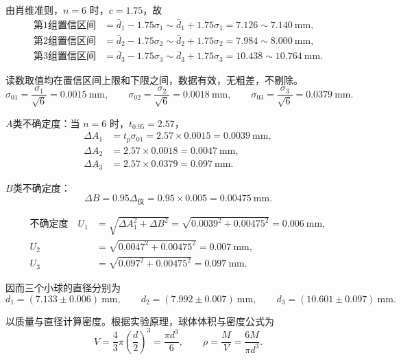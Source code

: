 \documentclass[12pt,a4paper,fontset=windows]{ctexart}
\begin{document}
由肖维准则，$n=6$ 时，$c=1.75$，故
\begin{align*}
    \text{第1组置信区间}&=\bar d_1-1.75\sigma_1\sim\bar d_1+1.75\sigma_1
        =7.126\sim7.140\ \mathrm{mm},\\
    \text{第2组置信区间}&=\bar d_2-1.75\sigma_2\sim\bar d_2+1.75\sigma_2
        =7.984\sim8.000\ \mathrm{mm},\\
    \text{第3组置信区间}&=\bar d_3-1.75\sigma_3\sim\bar d_3+1.75\sigma_3
        =10.438\sim10.764\ \mathrm{mm}.
\end{align*}

读数取值均在置信区间上限和下限之间，数据有效，无粗差，不剔除。
\begin{equation*}
    \sigma_{01}=\frac{\sigma_1}{\sqrt{6}}=0.0015\ \mathrm{mm},\qquad
    \sigma_{02}=\frac{\sigma_2}{\sqrt{6}}=0.0018\ \mathrm{mm},\qquad
    \sigma_{03}=\frac{\sigma_3}{\sqrt{6}}=0.0379\ \mathrm{mm}.
\end{equation*}

$A$类不确定度：当 $n=6$ 时，$t_{0.95}=2.57$，
\begin{align*}
    \Delta A_1&=t_p\sigma_{01}=2.57\times0.0015=0.0039\ \mathrm{mm},\\
    \Delta A_2&=2.57\times0.0018=0.0047\ \mathrm{mm},\\
    \Delta A_3&=2.57\times0.0379=0.097\ \mathrm{mm}.
\end{align*}

$B$类不确定度：
\begin{equation*}
    \Delta B=0.95\Delta_{\text{仪}}=0.95\times0.005=0.00475\ \mathrm{mm}.
\end{equation*}

\begin{align*}
    \text{不确定度}\quad
    U_1&=\sqrt{\Delta A_1^2+\Delta B^2}
        =\sqrt{0.0039^2+0.00475^2}=0.006\ \mathrm{mm},\\
    U_2&=\sqrt{0.0047^2+0.00475^2}=0.007\ \mathrm{mm},\\
    U_3&=\sqrt{0.097^2+0.00475^2}=0.097\ \mathrm{mm}.
\end{align*}

因而三个小球的直径分别为
\begin{equation*}
    d_1=(7.133\pm0.006)\ \mathrm{mm},\qquad
    d_2=(7.992\pm0.007)\ \mathrm{mm},\qquad
    d_3=(10.601\pm0.097)\ \mathrm{mm}.
\end{equation*}

以质量与直径计算密度。根据实验原理，球体体积与密度公式为
\begin{equation*}
    V=\frac{4}{3}\pi\left(\frac{d}{2}\right)^3=\frac{\pi d^3}{6},
    \qquad
    \rho=\frac{M}{V}=\frac{6M}{\pi d^3}.
\end{equation*}
\end{document}
